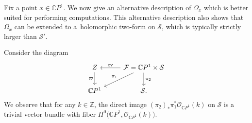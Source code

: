 \documentclass[pdftex]{sigma}
\numberwithin{equation}{section}
\theoremstyle{definition}
\newcommand\C{{\mathbb C}}
\begin{document}
Fix a point $x \in \C P^1$. We now give an alternative description of $\Omega_x$ which is
better suited for performing computations. This alternative description also shows that $\Omega_x$ can be
extended to a~holomorphic two-form on $\mathcal S$, which is typically strictly larger than
$\mathcal S'$.

Consider the diagram
\[
\begin{tikzcd}
Z \arrow[r, leftarrow, "\operatorname{ev}"] \arrow[d, "\varpi"'] & \mathcal F = \C P^1 \times \mathcal{S} \arrow[dl, "\pi_1"'] \arrow[d, "\pi_2"] \\
\C P^1 & \mathcal{S}.
\end{tikzcd}
\]
 We observe that for any $k \in \mathbb{Z}$, the direct image $(\pi_2)_*\pi_1^*\mathcal{O}_{\C P^1}(k)$
on $\mathcal S$ is a trivial vector bundle with fiber $H^0\bigl(\C P^1, \mathcal{O}_{\C P^1}(k)\bigr)$.
\end{document}
